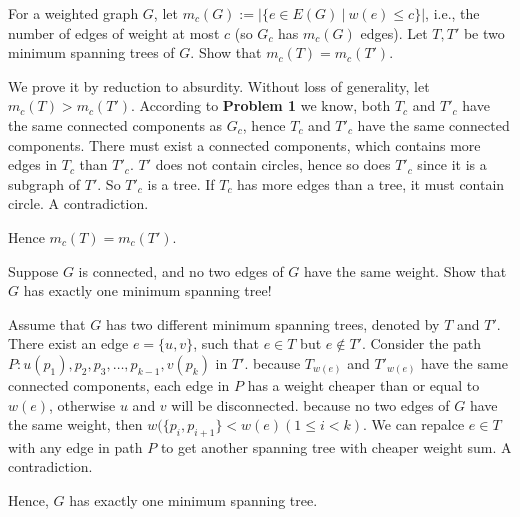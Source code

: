 \documentclass[11pt,a4paper,oneside]{article}
\begin{document}
\begin{problem}{2}
	\statement
	For a weighted graph $G$, let $m_c(G) := | \{ e \in E(G) \ | \ w(e) \leq c\}|$, i.e.,
	the number of edges of weight at most $c$ (so $G_c$ has $m_c(G)$ edges).
	Let $T, T'$ be two minimum spanning trees of $G$. Show that
	$m_c(T) = m_c(T')$.

	\solution
	
	We prove it by reduction to absurdity. Without loss of generality, let \(m_c(T) > m_c(T')\). According to \textbf{Problem 1} we know, both \(T_c\) and \(T'_c\) have the same connected components as \(G_c\), hence \(T_c\) and \(T'_c\) have the same connected components. There must exist a connected components, which contains more edges in \(T_c\) than \(T'_c\). \(T'\) does not contain circles, hence so does \(T'_c\) since it is a subgraph of \(T'\). So \(T'_c\) is a tree. If \(T_c\) has more edges than a tree, it must contain circle. A contradiction.
	
	Hence \(m_c(T) = m_c(T')\).
	
\end{problem}
\begin{problem}{3}
	\statement
	Suppose $G$ is connected, and no two edges of $G$ have the same weight. 
	Show that $G$ has exactly one minimum spanning tree!
	
	\solution  
	
	Assume that \(G\) has two different minimum spanning trees, denoted by \(T\) and \(T'\). There exist an edge \(e = \{u, v\}\), such that \(e \in T\) but \(e \not\in T'\). Consider the path \(P: u(p_1), p_2, p_3, \dots, p_{k-1}, v(p_k)\) in \(T'\). because \(T_{w(e)}\) and \(T'_{w(e)}\) have the same connected components, each edge in \(P\) has a weight cheaper than or equal to \(w(e)\), otherwise \(u\) and \(v\) will be disconnected. because no two edges of \(G\) have the same weight, then \(w(\{p_i, p_{i+1}\} < w(e) (1 \leq i < k)\). We can repalce \(e \in T\) with any edge in path \(P\) to get another spanning tree with cheaper weight sum. A contradiction.
	
	Hence, \(G\) has exactly one minimum spanning tree.
\end{problem}
\end{document}
